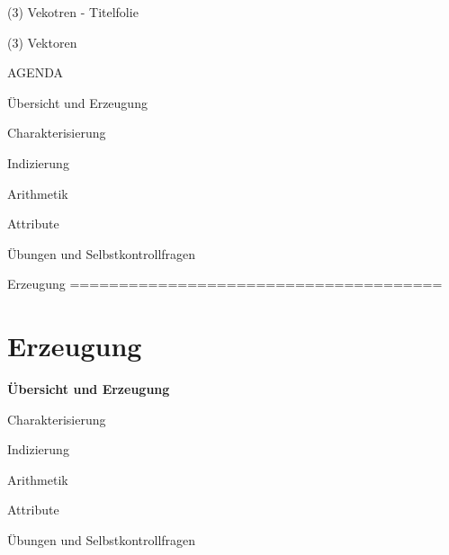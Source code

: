 \documentclass[
  8pt,
  ignorenonframetext,
]{beamer}
\begin{document}
\begin{frame}[plain]{(3) Vekotren - Titelfolie}
\protect\hypertarget{vekotren---titelfolie}{}
\vfill
\huge
\begin{center}
(3) Vektoren
\end{center}
\vfill
\end{frame}

\begin{frame}[plain]{AGENDA}
\protect\hypertarget{agenda}{}
\large
{}
\vfill

Übersicht und Erzeugung

Charakterisierung

Indizierung

Arithmetik

Attribute

Übungen und Selbstkontrollfragen
\end{frame}

\begin{frame}[plain]{Erzeugung ======================================}
\protect\hypertarget{erzeugung}{}
\AtBeginSection{}
\section{Erzeugung}

\large
{}
\vfill

\textbf{Übersicht und Erzeugung}

Charakterisierung

Indizierung

Arithmetik

Attribute

Übungen und Selbstkontrollfragen
\end{frame}
\end{document}
